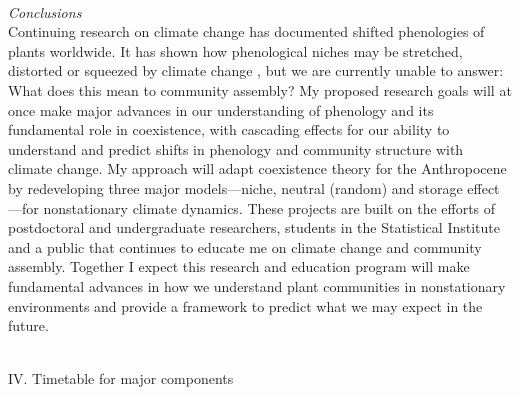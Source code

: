 \documentclass[12pt,a4paper,oneside]{article}
\begin{document}
\vspace{1.5ex}\\
\emph{Conclusions}
\vspace{1.5ex}\\
Continuing research on climate change has documented shifted phenologies of plants worldwide. It has shown how phenological niches may be stretched, distorted or squeezed by climate change \citep{CaraDonna2014}, but we are currently unable to answer: What does this mean to community assembly? My proposed research goals will at once make major advances in our understanding of phenology and its fundamental role in coexistence, with cascading effects for our ability to understand and predict shifts in phenology and community structure with climate change. My approach will adapt coexistence theory for the Anthropocene by redeveloping three major models---niche, neutral (random) and storage effect---for nonstationary climate dynamics. These projects are built on the efforts of postdoctoral and undergraduate researchers, students in the Statistical Institute and a public that continues to educate me on climate change and community assembly. Together I expect this research and education program will make fundamental advances in how we understand plant communities in nonstationary environments and provide a framework to predict what we may expect in the future. 
\begin{center}
\vspace{1.5ex}\\
{\sc IV. Timetable for major components}
\end{center}
\end{document}
